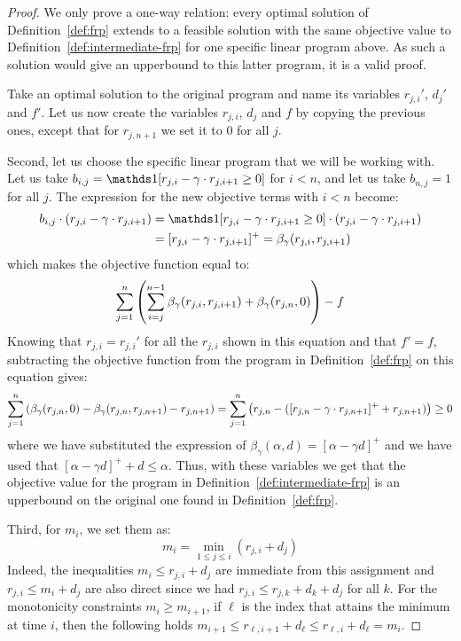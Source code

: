 \begin{proof}    
We only prove a one-way relation: every optimal solution of Definition~\ref{def:frp} extends to a feasible solution with the same objective value to Definition~\ref{def:intermediate-frp} for one specific linear program above. As such a solution would give an upperbound to this latter program, it is a valid proof. 

Take an optimal solution to the original program and name its variables $r_{j,i}'$, $d_j'$ and $f'$. Let us now create the variables $r_{j,i}$, $d_j$ and $f$ by copying the previous ones, except that for $r_{j,n+1}$ we set it to $0$ for all $j$.


Second, let us choose the specific linear program that we will be working with. Let us take $b_{i,j}=\ind[r_{j,i}-\Mcoeff \cdot r_{j,i+1}\ge0]$ for $i<n$, and let us take $b_{n,j}=1$ for all $j$. The expression for the new objective terms with $i<n$ become:
\begin{align*}
    b_{i,j} \cdot (r_{j,i} -\Mcoeff \cdot r_{j,i+1}) &= \ind[r_{j,i}-\Mcoeff \cdot r_{j,i+1}\ge0] \cdot (r_{j,i} -\Mcoeff \cdot r_{j,i+1}) \\
    &= [r_{j,i} -\Mcoeff \cdot r_{j,i+1}]^+ = \beta_{\Mcoeff} (r_{j,i},r_{j,i+1})
\end{align*}
which makes the objective function equal to:
\begin{equation*}
    \sum_{j=1}^{n} \left(\sum_{i=j}^{n-1} \beta_{\gamma}(r_{j,i}, r_{j,i+1}) + \beta_{\gamma}(r_{j,n},0)\right)- f 
\end{equation*}
Knowing that $r_{j,i}=r_{j,i}'$ for all the $r_{j,i}$ shown in this equation and that $f'=f$, subtracting the objective function from the program in Definition~\ref{def:frp} on this equation gives:
\begin{equation*}
    \sum_{j=1}^{n} \left(\beta_{\gamma}(r_{j,n},0)-\beta_{\gamma}(r_{j,n},r_{j,n+1}) - r_{j,n+1}\right) = \sum_{j=1}^{n} \left(r_{j,n}-([r_{j,n}-\gamma \cdot r_{j,n+1}]^+ + r_{j,n+1})\right) \geq 0
\end{equation*}
where we have substituted the expression of $\beta_{\gamma}(\alpha,d)=[\alpha-\gamma d]^+$ and we have used that $[\alpha-\gamma d]^+ + d \leq \alpha$.
Thus, with these variables we get that the objective value for the program in Definition~\ref{def:intermediate-frp} is an upperbound on the original one found in Definition~\ref{def:frp}.

Third, for $m_i$, we set them as:
\begin{equation*}\label{eq:mi-exact-definition}
    m_i = \min_{1\le j \leq i} (r_{j,i} + d_j)
\end{equation*}
Indeed, the inequalities $m_i \le r_{j,i} + d_j$ are immediate from this assignment and $r_{j,i} \le m_i + d_j$ are also direct since we had $r_{j,i} \le r_{j,k}+d_k + d_j$ for all $k$. For the monotonicity constraints $m_i \ge m_{i+1}$, if $\ell$ is the index that attains the minimum at time $i$, then the following holds $m_{i+1} \le r_{\ell,i+1} + d_\ell \le r_{\ell,i} + d_\ell = m_i$. 


\end{proof}
